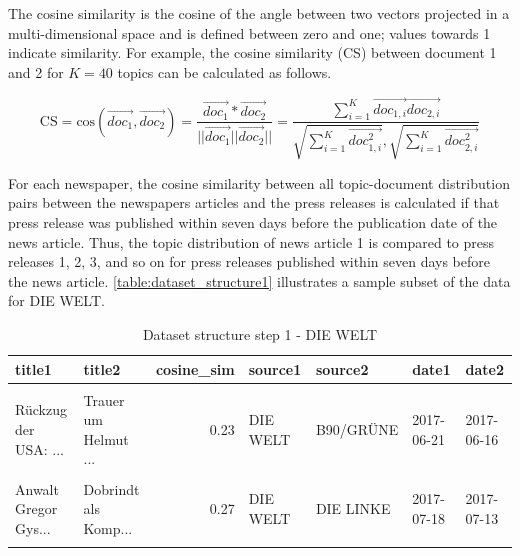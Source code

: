 \documentclass[
  12pt,
]{article}
\begin{document}
The cosine similarity is the cosine of the angle between two vectors
projected in a multi-dimensional space and is defined between zero and
one; values towards 1 indicate similarity. For example, the cosine
similarity (CS) between document 1 and 2 for \(K=40\) topics can be
calculated as follows.

\[
\text{CS} = \text{cos}(\vec{doc_1},\vec{doc_2})=\frac{\vec{doc_1}*\vec{doc_2}}{||\vec{doc_1}||\vec{doc_2}||}=\frac{\sum^K_{i=1} \vec{doc_{1,i}}\vec{doc_{2,i}}}{\sqrt{\sum^K_{i=1} \vec{doc^2_{1,i}}}, \sqrt{\sum^K_{i=1}\vec{doc^2_{2,i}}}}
\]

For each newspaper, the cosine similarity between all topic-document
distribution pairs between the newspapers articles and the press
releases is calculated if that press release was published within seven
days before the publication date of the news article. Thus, the topic
distribution of news article 1 is compared to press releases 1, 2, 3,
and so on for press releases published within seven days before the news
article. \autoref{table:dataset_structure1} illustrates a sample subset
of the data for DIE WELT.

\begin{table}[H]

\caption{\label{tab:Dataset structure 1}Dataset structure step 1 - DIE WELT \label{table:dataset_structure1}}
\centering
\fontsize{7}{9}\selectfont
\begin{tabular}[t]{llrllll}
\toprule
title1 & title2 & cosine\_sim & source1 & source2 & date1 & date2\\
\midrule
\cellcolor{gray!6}{SPD-Mitgliedervot...} & \cellcolor{gray!6}{Der Osten braucht...} & \cellcolor{gray!6}{0.20} & \cellcolor{gray!6}{DIE WELT} & \cellcolor{gray!6}{DIE LINKE} & \cellcolor{gray!6}{2018-02-11} & \cellcolor{gray!6}{2018-02-09}\\
Rückzug der USA: ... & Trauer um Helmut ... & 0.23 & DIE WELT & B90/GRÜNE & 2017-06-21 & 2017-06-16\\
\cellcolor{gray!6}{Identitäre Bewegu...} & \cellcolor{gray!6}{Großer Zuspruch f...} & \cellcolor{gray!6}{0.21} & \cellcolor{gray!6}{DIE WELT} & \cellcolor{gray!6}{AfD} & \cellcolor{gray!6}{2017-12-19} & \cellcolor{gray!6}{2017-12-15}\\
Anwalt Gregor Gys... & Dobrindt als Komp... & 0.27 & DIE WELT & DIE LINKE & 2017-07-18 & 2017-07-13\\
\cellcolor{gray!6}{Streitthema Migra...} & \cellcolor{gray!6}{Simbabwe braucht ...} & \cellcolor{gray!6}{0.06} & \cellcolor{gray!6}{DIE WELT} & \cellcolor{gray!6}{DIE LINKE} & \cellcolor{gray!6}{2017-11-17} & \cellcolor{gray!6}{2017-11-15}\\
\bottomrule
\end{tabular}
\end{table}
\end{document}
